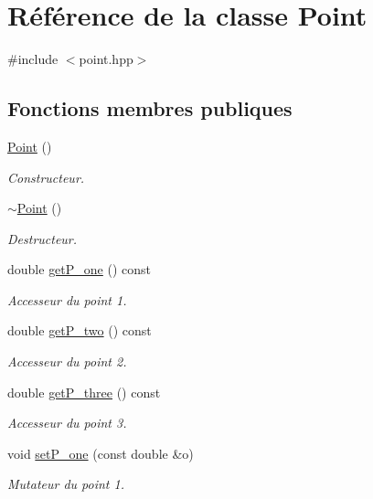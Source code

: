 \hypertarget{class_point}{\section{Référence de la classe Point}
\label{class_point}
}


{\ttfamily \#include $<$point.\-hpp$>$}

\subsection*{Fonctions membres publiques}
\begin{DoxyCompactItemize}
\item 
\hyperlink{class_point_ad92f2337b839a94ce97dcdb439b4325a}{Point} ()
\begin{DoxyCompactList}\small\item\em Constructeur. \end{DoxyCompactList}\item 
\hyperlink{class_point_a395fa04b4ec126b66fc053f829a30cc1}{$\sim$\-Point} ()
\begin{DoxyCompactList}\small\item\em Destructeur. \end{DoxyCompactList}\item 
double \hyperlink{class_point_a211f8dee098122a2f1c326ba42652ee2}{get\-P\-\_\-one} () const 
\begin{DoxyCompactList}\small\item\em Accesseur du point 1. \end{DoxyCompactList}\item 
double \hyperlink{class_point_afd9ee8dca2913903fd6a1a95d743afaa}{get\-P\-\_\-two} () const 
\begin{DoxyCompactList}\small\item\em Accesseur du point 2. \end{DoxyCompactList}\item 
double \hyperlink{class_point_adf0f89d9beca24315b45d96786896a56}{get\-P\-\_\-three} () const 
\begin{DoxyCompactList}\small\item\em Accesseur du point 3. \end{DoxyCompactList}\item 
void \hyperlink{class_point_ac79f8c3f0fb8b9dea4f5b8a8e0315779}{set\-P\-\_\-one} (const double \&o)
\begin{DoxyCompactList}\small\item\em Mutateur du point 1. \end{DoxyCompactList}\item 

\end{DoxyCompactItemize}
